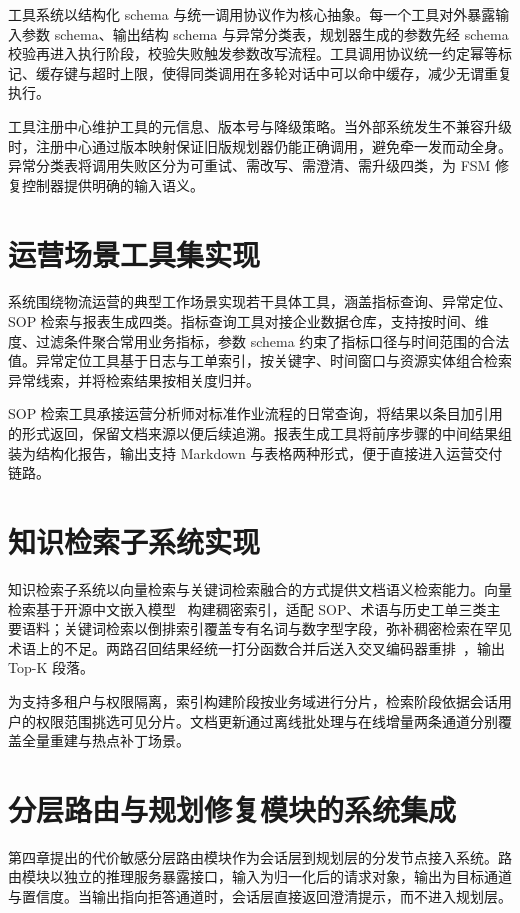 工具系统以结构化 schema 与统一调用协议作为核心抽象。每一个工具对外暴露输入参数 schema、输出结构 schema 与异常分类表，规划器生成的参数先经 schema 校验再进入执行阶段，校验失败触发参数改写流程。工具调用协议统一约定幂等标记、缓存键与超时上限，使得同类调用在多轮对话中可以命中缓存，减少无谓重复执行。

工具注册中心维护工具的元信息、版本号与降级策略。当外部系统发生不兼容升级时，注册中心通过版本映射保证旧版规划器仍能正确调用，避免牵一发而动全身。异常分类表将调用失败区分为可重试、需改写、需澄清、需升级四类，为 FSM 修复控制器提供明确的输入语义。

\section{运营场景工具集实现}

系统围绕物流运营的典型工作场景实现若干具体工具，涵盖指标查询、异常定位、SOP 检索与报表生成四类。指标查询工具对接企业数据仓库，支持按时间、维度、过滤条件聚合常用业务指标，参数 schema 约束了指标口径与时间范围的合法值。异常定位工具基于日志与工单索引，按关键字、时间窗口与资源实体组合检索异常线索，并将检索结果按相关度归并。

SOP 检索工具承接运营分析师对标准作业流程的日常查询，将结果以条目加引用的形式返回，保留文档来源以便后续追溯。报表生成工具将前序步骤的中间结果组装为结构化报告，输出支持 Markdown 与表格两种形式，便于直接进入运营交付链路。

\section{知识检索子系统实现}

知识检索子系统以向量检索与关键词检索融合的方式提供文档语义检索能力。向量检索基于开源中文嵌入模型~\cite{bge} 构建稠密索引，适配 SOP、术语与历史工单三类主要语料；关键词检索以倒排索引覆盖专有名词与数字型字段，弥补稠密检索在罕见术语上的不足。两路召回结果经统一打分函数合并后送入交叉编码器重排~\cite{rerank}，输出 Top-K 段落。

为支持多租户与权限隔离，索引构建阶段按业务域进行分片，检索阶段依据会话用户的权限范围挑选可见分片。文档更新通过离线批处理与在线增量两条通道分别覆盖全量重建与热点补丁场景。

\section{分层路由与规划修复模块的系统集成}

第四章提出的代价敏感分层路由模块作为会话层到规划层的分发节点接入系统。路由模块以独立的推理服务暴露接口，输入为归一化后的请求对象，输出为目标通道与置信度。当输出指向拒答通道时，会话层直接返回澄清提示，而不进入规划层。

